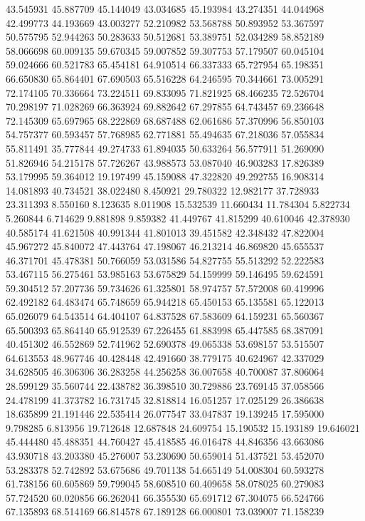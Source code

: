 43.545931
45.887709
45.144049
43.034685
45.193984
43.274351
44.044968
42.499773
44.193669
43.003277
52.210982
53.568788
50.893952
53.367597
50.575795
52.944263
50.283633
50.512681
53.389751
52.034289
58.852189
58.066698
60.009135
59.670345
59.007852
59.307753
57.179507
60.045104
59.024666
60.521783
65.454181
64.910514
66.337333
65.727954
65.198351
66.650830
65.864401
67.690503
65.516228
64.246595
70.344661
73.005291
72.174105
70.336664
73.224511
69.833095
71.821925
68.466235
72.526704
70.298197
71.028269
66.363924
69.882642
67.297855
64.743457
69.236648
72.145309
65.697965
68.222869
68.687488
62.061686
57.370996
56.850103
54.757377
60.593457
57.768985
62.771881
55.494635
67.218036
57.055834
55.811491
35.777844
49.274733
61.894035
50.633264
56.577911
51.269090
51.826946
54.215178
57.726267
43.988573
53.087040
46.903283
17.826389
53.179995
59.364012
19.197499
45.159088
47.322820
49.292755
16.908314
14.081893
40.734521
38.022480
8.450921
29.780322
12.982177
37.728933
23.311393
8.550160
8.123635
8.011908
15.532539
11.660434
11.784304
5.822734
5.260844
6.714629
9.881898
9.859382
41.449767
41.815299
40.610046
42.378930
40.585174
41.621508
40.991344
41.801013
39.451582
42.348432
47.822004
45.967272
45.840072
47.443764
47.198067
46.213214
46.869820
45.655537
46.371701
45.478381
50.766059
53.031586
54.827755
55.513292
52.222583
53.467115
56.275461
53.985163
53.675829
54.159999
59.146495
59.624591
59.304512
57.207736
59.734626
61.325801
58.974757
57.572008
60.419996
62.492182
64.483474
65.748659
65.944218
65.450153
65.135581
65.122013
65.026079
64.543514
64.404107
64.837528
67.583609
64.159231
65.560367
65.500393
65.864140
65.912539
67.226455
61.883998
65.447585
68.387091
40.451302
46.552869
52.741962
52.690378
49.065338
53.698157
53.515507
64.613553
48.967746
40.428448
42.491660
38.779175
40.624967
42.337029
34.628505
46.306306
36.283258
44.256258
36.007658
40.700087
37.806064
28.599129
35.560744
22.438782
36.398510
30.729886
23.769145
37.058566
24.478199
41.373782
16.731745
32.818814
16.051257
17.025129
26.386638
18.635899
21.191446
22.535414
26.077547
33.047837
19.139245
17.595000
9.798285
6.813956
19.712648
12.687848
24.609754
15.190532
15.193189
19.646021
45.444480
45.488351
44.760427
45.418585
46.016478
44.846356
43.663086
43.930718
43.203380
45.276007
53.230690
50.659014
51.437521
53.452070
53.283378
52.742892
53.675686
49.701138
54.665149
54.008304
60.593278
61.738156
60.605869
59.799045
58.608510
60.409658
58.078025
60.279083
57.724520
60.020856
66.262041
66.355530
65.691712
67.304075
66.524766
67.135893
68.514169
66.814578
67.189128
66.000801
73.039007
71.158239

